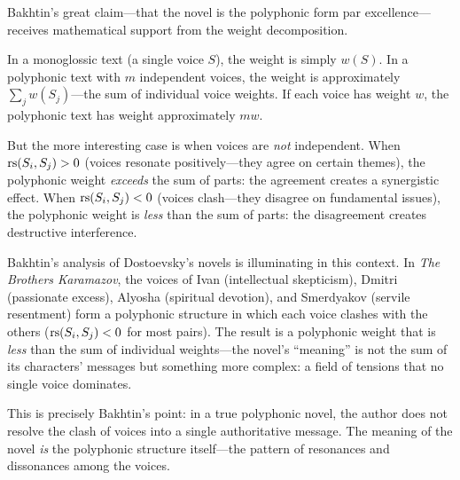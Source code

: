 \begin{interpretation}
\label{interp:polyphony}
Bakhtin's great claim---that the novel is the polyphonic form par
excellence---receives mathematical support from the weight decomposition.

In a monoglossic text (a single voice $S$), the weight is simply $w(S)$.
In a polyphonic text with $m$ independent voices, the weight is approximately
$\sum_j w(S_j)$---the sum of individual voice weights.  If each voice has
weight $w$, the polyphonic text has weight approximately $mw$.

But the more interesting case is when voices are \emph{not} independent.  When
$\mathrm{rs}(S_i, S_j) > 0$ (voices resonate positively---they agree on certain
themes), the polyphonic weight \emph{exceeds} the sum of parts: the agreement
creates a synergistic effect.  When $\mathrm{rs}(S_i, S_j) < 0$ (voices clash---they
disagree on fundamental issues), the polyphonic weight is \emph{less} than the
sum of parts: the disagreement creates destructive interference.

Bakhtin's analysis of Dostoevsky's novels is illuminating in this context.  In
\emph{The Brothers Karamazov}, the voices of Ivan (intellectual skepticism),
Dmitri (passionate excess), Alyosha (spiritual devotion), and Smerdyakov
(servile resentment) form a polyphonic structure in which each voice clashes
with the others ($\mathrm{rs}(S_i, S_j) < 0$ for most pairs).  The result is a
polyphonic weight that is \emph{less} than the sum of individual weights---the
novel's ``meaning'' is not the sum of its characters' messages but something
more complex: a field of tensions that no single voice dominates.

This is precisely Bakhtin's point: in a true polyphonic novel, the author does
not resolve the clash of voices into a single authoritative message.  The
meaning of the novel \emph{is} the polyphonic structure itself---the pattern
of resonances and dissonances among the voices.
\end{interpretation}


